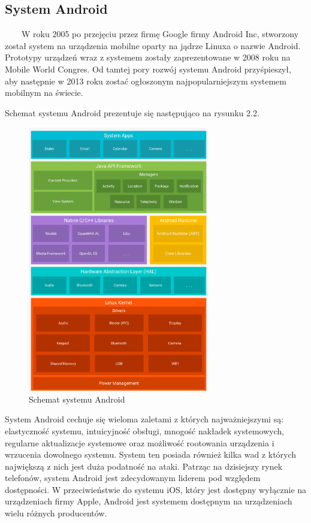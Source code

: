 \documentclass[a4paper,12pt,oneside]{book}
\begin{document}
	\subsection{System Android}
	\ \ \ \
	W roku 2005 po przejęciu przez firmę Google firmy Android Inc, stworzony został system na urządzenia mobilne oparty na jądrze Linuxa o nazwie Android. Prototypy urządzeń wraz z systemem zostały zaprezentowane w 2008 roku na Mobile World Congres. Od tamtej pory rozwój systemu Android przyśpieszył, aby następnie w 2013 roku zostać ogłoszonym najpopularniejszym systemem mobilnym na świecie.
	
	\newpage
	Schemat systemu Android prezentuje się następująco na rysunku 2.2.
	
	\begin{figure}[h]
		\centering
		\includegraphics[width=0.70\textwidth]{grafika/schemat_android.png}
		\caption{Schemat systemu Android}
	\end{figure}
	
	System Android cechuje się wieloma zaletami z których najważniejszymi są: elastyczność systemu, intuicyjność obsługi, mnogość nakładek systemowych, regularne aktualizacje systemowe oraz możliwość rootowania urządzenia i wrzucenia dowolnego systemu. System ten posiada również kilka wad z których największą z nich jest duża podatność na ataki. Patrząc na dzisiejszy rynek telefonów, system Android jest zdecydowanym liderem pod względem dostępności. W przeciwieństwie do systemu iOS, który jest dostępny wyłącznie na urządzeniach firmy Apple, Android jest systemem dostępnym na urządzeniach wielu różnych producentów.
	
\end{document}
